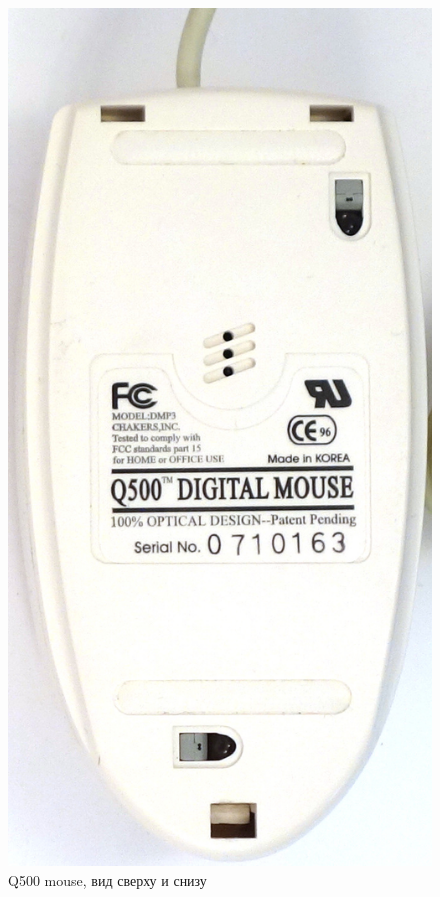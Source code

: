 \documentclass[11pt, a4paper]{article}
\begin{document}
\begin{figure}[h]
    \includegraphics[scale=0.5]{1996_q500_mouse/bottom_30.jpg}
    \caption{Q500 mouse, вид сверху и снизу}
    \label{fig:q500mouseTopBottom}
\end{figure}
\end{document}
